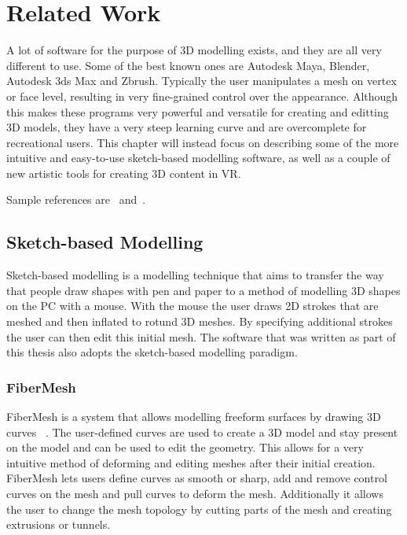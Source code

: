 
\chapter{Related Work}
A lot of software for the purpose of 3D modelling exists, and they are all very different to use. Some of the best known ones are Autodesk Maya, Blender, Autodesk 3ds Max and Zbrush.  Typically the user manipulates a mesh on vertex or face level, resulting in very fine-grained control over the appearance. Although this makes these programs very powerful and versatile for creating and editting 3D models, they have a very steep learning curve and are overcomplete for recreational users. This chapter will instead focus on describing some of the more intuitive and easy-to-use sketch-based modelling software, as well as a couple of new artistic tools for creating 3D content in VR. 

Sample references are~\cite{Zwicker04Perspective} and~\cite{Altman89QuaternionScandal}. 

\section{Sketch-based Modelling}
Sketch-based modelling is a modelling technique that aims to transfer the way that people draw shapes with pen and paper to a method of modelling 3D shapes on the PC with a mouse. With the mouse the user draws 2D strokes that are meshed and then inflated to rotund 3D meshes. By specifying additional strokes the user can then edit this initial mesh.
The software that was written as part of this thesis also adopts the sketch-based modelling paradigm. 


\subsection{FiberMesh}
FiberMesh is a system that allows modelling freeform surfaces by drawing 3D curves ~\cite{Nealen2007}. The user-defined curves are used to create a 3D model and stay present on the model and can be used to edit the geometry. This allows for a very intuitive method of deforming and editing meshes after their initial creation. FiberMesh lets users define curves as smooth or sharp, add and remove control curves on the mesh and pull curves to deform the mesh. Additionally it allows the user to change the mesh topology by cutting parts of the mesh and creating extrusions or tunnels.

